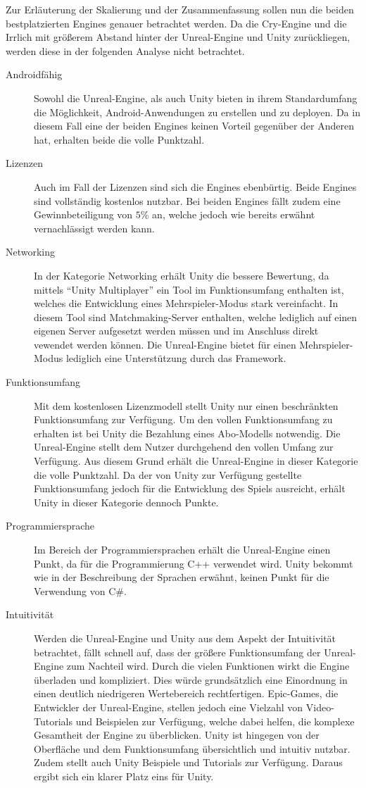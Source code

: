 	Zur Erläuterung der Skalierung und der Zusammenfassung sollen nun die beiden bestplatzierten Engines genauer betrachtet werden.
	Da die Cry-Engine und die Irrlich mit größerem Abstand hinter der Unreal-Engine und Unity zurückliegen, werden diese in der folgenden Analyse nicht betrachtet.
	\begin{description}
		\item[Androidfähig]{Sowohl die Unreal-Engine, als auch Unity bieten in ihrem Standardumfang die Möglichkeit, Android-Anwendungen zu erstellen und zu deployen. Da in diesem Fall eine der beiden Engines keinen Vorteil gegenüber der Anderen hat, erhalten beide die volle Punktzahl.}
		\item[Lizenzen]{Auch im Fall der Lizenzen sind sich die Engines ebenbürtig. Beide Engines sind vollständig kostenlos nutzbar. Bei beiden Engines fällt zudem eine Gewinnbeteiligung von $5$\% an, welche jedoch wie bereits erwähnt vernachlässigt werden kann.}
		\item[Networking]{In der Kategorie Networking erhält Unity die bessere Bewertung, da mittels \enquote{Unity Multiplayer} ein Tool im Funktionsumfang enthalten ist, welches die Entwicklung eines Mehrspieler-Modus stark vereinfacht. In diesem Tool sind Matchmaking-Server enthalten, welche lediglich auf einen eigenen Server aufgesetzt werden müssen und im Anschluss direkt vewendet werden können. Die Unreal-Engine bietet für einen Mehrspieler-Modus lediglich eine Unterstützung durch das Framework.}
		\item[Funktionsumfang]{Mit dem kostenlosen Lizenzmodell stellt Unity nur einen beschränkten Funktionsumfang zur Verfügung. Um den vollen Funktionsumfang zu erhalten ist bei Unity die Bezahlung eines Abo-Modells notwendig. Die Unreal-Engine stellt dem Nutzer durchgehend den vollen Umfang zur Verfügung. Aus diesem Grund erhält die Unreal-Engine in dieser Kategorie die volle Punktzahl. Da der von Unity zur Verfügung gestellte Funktionsumfang jedoch für die Entwicklung des Spiels ausreicht, erhält Unity in dieser Kategorie dennoch Punkte.}
		\item[Programmiersprache]{Im Bereich der Programmiersprachen erhält die Unreal-Engine einen Punkt, da für die Programmierung C++ verwendet wird. Unity bekommt wie in der Beschreibung der Sprachen erwähnt, keinen Punkt für die Verwendung von C\#.}
		\item[Intuitivität]{Werden die Unreal-Engine und Unity aus dem Aspekt der Intuitivität betrachtet, fällt schnell auf, dass der größere Funktionsumfang der Unreal-Engine zum Nachteil wird. Durch die vielen Funktionen wirkt die Engine überladen und kompliziert. Dies würde grundsätzlich eine Einordnung in einen deutlich niedrigeren Wertebereich rechtfertigen. Epic-Games, die Entwickler der Unreal-Engine, stellen jedoch eine Vielzahl von Video-Tutorials und Beispielen zur Verfügung, welche dabei helfen, die komplexe Gesamtheit der Engine zu überblicken. Unity ist hingegen von der Oberfläche und dem Funktionsumfang übersichtlich und intuitiv nutzbar. Zudem stellt auch Unity Beispiele und Tutorials zur Verfügung. Daraus ergibt sich ein klarer Platz eins für Unity.}

\end{description}
